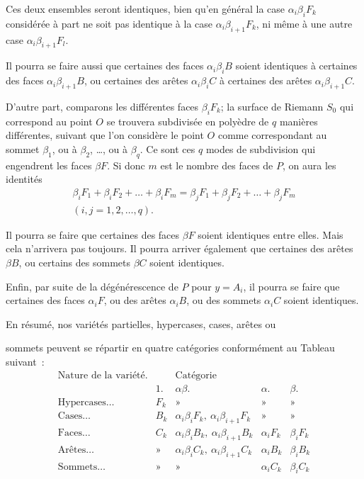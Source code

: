 \documentclass{article}
\begin{document}
Ces deux ensembles seront identiques, bien qu'en général la case $\alpha_{i}\beta_{i}F_{k}$ considérée à part ne soit pas identique à la case $\alpha_{i}\beta_{i+1}F_{k}$, ni même à une autre case $\alpha_{i}\beta_{i+1}F_{l}$.

Il pourra se faire aussi que certaines des faces $\alpha_{i}\beta_{i}B$ soient identiques à certaines des faces $\alpha_{i}\beta_{i+1}B$, ou certaines des arêtes $\alpha_{i}\beta_{i}C$ à certaines des arêtes $\alpha_{i}\beta_{i+1}C$.

D'autre part, comparons les différentes faces $\beta_{i}F_{k}$; la surface de Riemann $S_{0}$ qui correspond au point $O$ se trouvera subdivisée en polyèdre de $q$ manières différentes, suivant que l'on considère le point $O$ comme correspondant au sommet $\beta_{1}$, ou à $\beta_{2}$, \ldots, ou à $\beta_{q}$. Ce sont ces $q$ modes de subdivision qui engendrent les faces $\beta F$. Si donc $m$ est le nombre des faces de $P$, on aura les identités
\[ \begin{gathered} \beta_{i}F_{1} + \beta_{i}F_{2} + \ldots + \beta_{i}F_{m} = \beta_{j}F_{1} + \beta_{j}F_{2} + \ldots + \beta_{j}F_{m} \\ (i, j = 1, 2, \ldots, q). \end{gathered} \tag{2} \]

Il pourra se faire que certaines des faces $\beta F$ soient identiques entre elles. Mais cela n'arrivera pas toujours. Il pourra arriver également que certaines des arêtes $\beta B$, ou certains des sommets $\beta C$ soient identiques.

Enfin, par suite de la dégénérescence de $P$ pour $y = A_{i}$, il pourra se faire que certaines des faces $\alpha_{i}F$, ou des arêtes $\alpha_{i}B$, ou des sommets $\alpha_{i}C$ soient identiques.

En résumé, nos variétés partielles, hypercases, cases, arêtes ou

sommets peuvent se répartir en quatre catégories conformément au Tableau suivant~:
\[ \begin{matrix} \text{Nature de la variété.} & & \text{Catégorie} & & \\[1ex] & 1. & \alpha\beta. & \alpha. & \beta. \\[1ex] \text{Hypercases}\ldots & F_{k} & \text{»} & \text{»} & \text{»} \\[1ex] \text{Cases}\ldots & B_{k} & \alpha_{i}\beta_{i}F_{k},\ \alpha_{i}\beta_{i+1}F_{k} & \text{»} & \text{»} \\[1ex] \text{Faces}\ldots & C_{k} & \alpha_{i}\beta_{i}B_{k},\ \alpha_{i}\beta_{i+1}B_{k} & \alpha_{i}F_{k} & \beta_{i}F_{k} \\[1ex] \text{Arêtes}\ldots & \text{»} & \alpha_{i}\beta_{i}C_{k},\ \alpha_{i}\beta_{i+1}C_{k} & \alpha_{i}B_{k} & \beta_{i}B_{k} \\[1ex] \text{Sommets}\ldots & \text{»} & \text{»} & \alpha_{i}C_{k} & \beta_{i}C_{k} \end{matrix} \]
\end{document}

